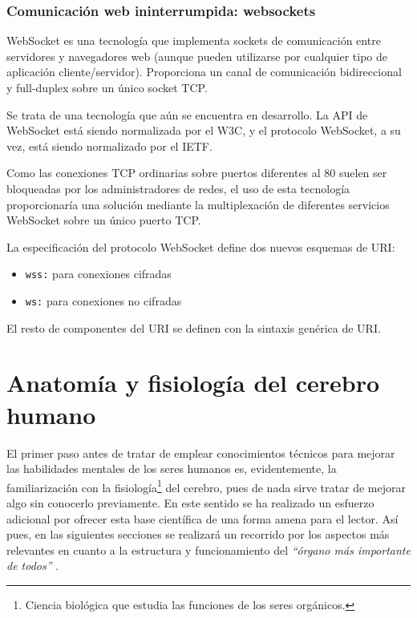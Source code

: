 \subsubsection{Comunicación web ininterrumpida: websockets}
\label{sec::tiempo-real}

WebSocket es una tecnología que implementa sockets de comunicación entre servidores y navegadores web (aunque pueden utilizarse por cualquier tipo de aplicación cliente/servidor). Proporciona un canal de comunicación bidireccional y full-duplex sobre un único socket TCP.

Se trata de una tecnología que aún se encuentra en desarrollo. La API de WebSocket está siendo normalizada por el W3C, y el protocolo WebSocket, a su vez, está siendo normalizado por el IETF.

Como las conexiones TCP ordinarias sobre puertos diferentes al 80 suelen ser bloqueadas por los administradores de redes, el uso de esta tecnología proporcionaría una solución mediante la multiplexación de diferentes servicios WebSocket sobre un único puerto TCP.

La especificación del protocolo WebSocket define dos nuevos esquemas de URI:

\begin{itemize}
\item {\tt wss:} para conexiones cifradas
\item {\tt ws:} para conexiones no cifradas
\end{itemize}

El resto de componentes del URI se definen con la sintaxis genérica de URI.

\section{Anatomía y fisiología del cerebro humano}
\label{sec::fisiologia}


El primer paso antes de tratar de emplear conocimientos técnicos para mejorar las habilidades mentales de los seres humanos es, evidentemente, la familiarización con la fisiología\footnote{Ciencia biológica que estudia las funciones de los seres orgánicos.} del cerebro, pues de nada sirve tratar de mejorar algo sin conocerlo previamente. En este sentido se ha realizado un esfuerzo adicional por ofrecer esta base científica de una forma amena para el lector. Así pues, en las siguientes secciones se realizará un recorrido por los aspectos más relevantes en cuanto a la estructura y funcionamiento del {\it ``órgano más importante de todos''} \cite{Jacyna2009}.

